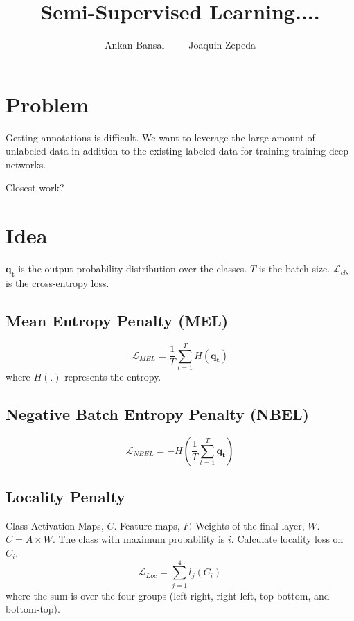 \documentclass[runningheads]{llncs}
\begin{document}
%
\title{Semi-Supervised Learning....} 

%
\author{Ankan Bansal~~~~~Joaquin Zepeda}

%
\maketitle              %

\section{Problem}
Getting annotations is difficult. We want to leverage the large amount of unlabeled data in addition
to the existing labeled data for training training deep networks. 

Closest work?


\section{Idea}

$\mathbf{q_t}$ is the output probability distribution over the classes. $T$ is the batch size.
$\mathcal{L}_{cls}$ is the cross-entropy loss. 

\subsection{Mean Entropy Penalty (MEL)}
\begin{equation}
	\mathcal{L}_{MEL} = \frac{1}{T}\sum_{t=1}^{T}H(\mathbf{q_t})
\end{equation}
where $H(.)$ represents the entropy. 

\subsection{Negative Batch Entropy Penalty (NBEL)}
\begin{equation}
	\mathcal{L}_{NBEL} = -H(\frac{1}{T}\sum_{t=1}^{T}\mathbf{q_t})
\end{equation}


\subsection{Locality Penalty}
Class Activation Maps, $C$. Feature maps, $F$. Weights of the final layer, $W$. $C = A \times W$.
The class with maximum probability is $i$. Calculate locality loss on $C_i$. 
\begin{equation}
	\mathcal{L}_{Loc} = \sum_{j=1}^{4}l_j(C_i)
\end{equation}
where the sum is over the four groups (left-right, right-left, top-bottom, and bottom-top).
\end{document}
